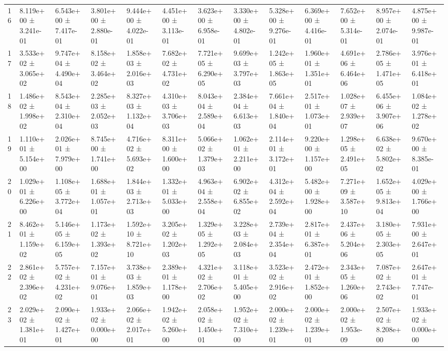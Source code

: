 \begin{table}
\begin{tabular}{lllllllllllll}
16 & 8.119e+00 ± 3.241e-01 & 6.543e+00 ± 7.417e-01 & 3.801e+00 ± 2.880e-01 & 9.444e+00 ± 4.022e-01 & 4.451e+00 ± 3.113e-01 & 3.623e+00 ± 6.958e-01 & 3.330e+00 ± 4.802e-01 & 5.328e+00 ± 9.276e-01 & 6.369e+00 ± 4.416e-01 & 7.652e+00 ± 5.314e-01 & 8.957e+00 ± 2.074e-01 & 4.875e+00 ± 9.987e-01 \\
17 & 3.533e+02 ± 3.065e+02 & 9.747e+04 ± 4.490e+04 & 8.158e+02 ± 3.464e+02 & 1.858e+03 ± 2.016e+03 & 7.682e+02 ± 4.731e+02 & 7.721e+05 ± 6.290e+05 & 9.699e+03 ± 3.797e+03 & 1.242e+05 ± 1.863e+05 & 1.960e+01 ± 1.351e+01 & 4.691e+06 ± 6.464e+06 & 2.786e+05 ± 1.471e+05 & 3.976e+01 ± 6.418e+01 \\
18 & 1.486e+02 ± 1.998e+02 & 8.543e+04 ± 2.310e+04 & 2.285e+03 ± 2.052e+03 & 8.327e+03 ± 1.132e+04 & 4.310e+03 ± 3.706e+03 & 8.043e+04 ± 2.589e+04 & 2.384e+04 ± 6.613e+03 & 7.661e+04 ± 1.840e+04 & 2.517e+01 ± 1.073e+01 & 1.028e+07 ± 2.939e+07 & 6.455e+06 ± 3.907e+06 & 1.084e+02 ± 1.278e+02 \\
19 & 1.110e+01 ± 5.154e+00 & 2.026e+01 ± 7.979e+00 & 8.745e+00 ± 1.741e+00 & 4.716e+02 ± 5.693e+02 & 8.311e+00 ± 1.600e+00 & 5.066e+02 ± 1.379e+03 & 1.062e+01 ± 2.211e+00 & 2.114e+01 ± 3.172e+01 & 9.220e+00 ± 1.157e+00 & 1.298e+05 ± 2.491e+05 & 6.638e+02 ± 5.802e+02 & 9.670e+00 ± 8.385e-01 \\
20 & 1.029e+01 ± 6.226e+00 & 1.108e+05 ± 3.772e+04 & 1.688e+01 ± 1.057e+01 & 1.844e+03 ± 2.713e+03 & 1.332e+01 ± 5.033e+00 & 4.963e+04 ± 2.558e+04 & 6.902e+02 ± 6.855e+02 & 4.312e+04 ± 2.592e+04 & 5.482e+00 ± 1.928e+00 & 7.271e+09 ± 3.587e+10 & 1.652e+05 ± 9.813e+04 & 4.029e+00 ± 1.766e+00 \\
21 & 8.462e+01 ± 1.159e+02 & 5.146e+05 ± 6.159e+05 & 1.173e+02 ± 1.393e+02 & 1.592e+10 ± 8.721e+10 & 3.205e+02 ± 1.202e+03 & 1.329e+05 ± 1.292e+05 & 3.228e+03 ± 2.084e+03 & 2.739e+04 ± 2.354e+04 & 2.817e+01 ± 6.387e+01 & 2.437e+06 ± 5.204e+06 & 3.180e+05 ± 2.303e+05 & 7.931e+00 ± 2.647e+01 \\
22 & 2.861e+02 ± 2.396e+02 & 5.757e+02 ± 4.231e+02 & 7.157e+01 ± 9.076e+01 & 3.738e+03 ± 1.859e+03 & 2.389e+01 ± 1.178e+00 & 4.321e+02 ± 2.706e+02 & 3.118e+01 ± 5.405e+00 & 3.523e+02 ± 2.916e+02 & 2.472e+01 ± 1.852e+00 & 2.343e+05 ± 1.260e+06 & 7.087e+02 ± 2.743e+02 & 2.647e+01 ± 7.747e-01 \\
23 & 2.029e+02 ± 1.381e+01 & 2.090e+02 ± 1.427e+01 & 1.933e+02 ± 0.000e+00 & 2.066e+02 ± 2.017e+01 & 1.942e+02 ± 5.260e+00 & 2.058e+02 ± 1.450e+01 & 1.952e+02 ± 7.310e+00 & 2.000e+02 ± 1.239e+01 & 2.000e+02 ± 1.239e+01 & 2.000e+02 ± 1.953e-09 & 2.507e+02 ± 8.208e+00 & 1.933e+02 ± 0.000e+00 \\

\end{tabular}
\end{table}
